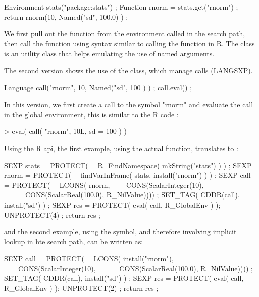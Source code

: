 \begin{example}
Environment stats("package:stats") ;
Function rnorm = stats.get("rnorm") ;
return rnorm(10, Named("sd", 100.0) ) ;
\end{example}

We first pull out the  function from the environment 
called  in the search path, then call the function
using syntax similar to calling the function in R. The  
class is an utility class that helps emulating the use of 
named arguments.

The second version shows the use of the  class, which 
manage calls (LANGSXP). 

\begin{example}
Language call("rnorm", 10, Named("sd", 100 ) ) ;
call.eval() ;
\end{example}


In this version, we first create a call to the symbol "rnorm" and
evaluate the call in the global environment, this is similar to the 
R code : 

\begin{example}
> eval( call( "rnorm", 10L, sd = 100 ) )
\end{example}

Using the R api, the first example, using the actual
 function,
translates to :

\begin{example}
SEXP stats = PROTECT( 
\ \ R_FindNamespace( mkString("stats") ) ) ;
SEXP rnorm = PROTECT( 
\ \ findVarInFrame( stats, install("rnorm") ) ) ;
SEXP call  = PROTECT( 
\ \ LCONS( rnorm, 
\ \ \ \ CONS(ScalarInteger(10), 
\ \ \ \ \ \ CONS(ScalarReal(100.0), R_NilValue)))) ;
SET_TAG( CDDR(call), install("sd") ) ;
SEXP res = PROTECT( eval( call, R_GlobalEnv ) );
UNPROTECT(4) ;
return res ;
\end{example}

and the second example, using the  symbol, and therefore
involving implicit lookup in hte search path, can be written as:

\begin{example}
SEXP call  = PROTECT( 
\ \ LCONS( install("rnorm"), 
\ \ \ \ CONS(ScalarInteger(10), 
\ \ \ \ \ \ CONS(ScalarReal(100.0), R_NilValue)))) ;
SET_TAG( CDDR(call), install("sd") ) ;
SEXP res = PROTECT( eval( call, R_GlobalEnv ) );
UNPROTECT(2) ;
return res ;
\end{example}


